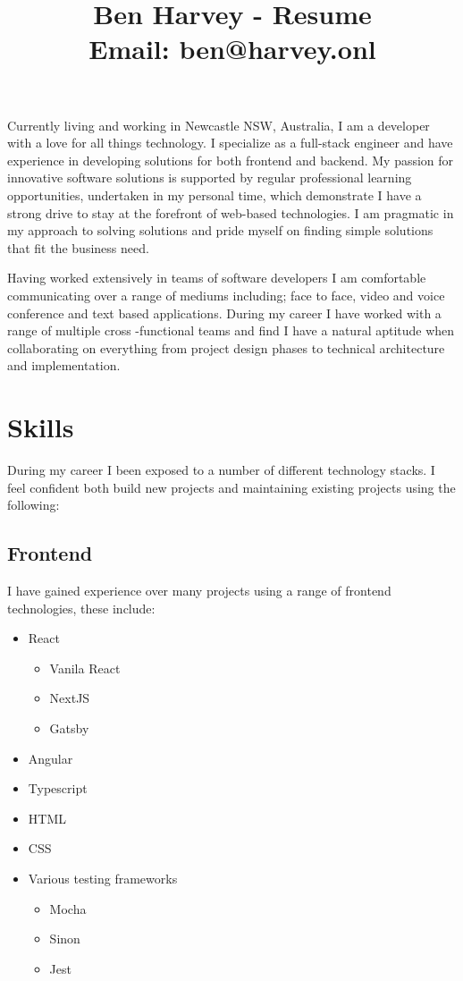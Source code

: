\documentclass[11pt]{article}
\date{}
\title{Ben Harvey - Resume\\\medskip
\large Email: ben@harvey.onl}
\begin{document}
\maketitle
Currently living and working in Newcastle NSW, Australia, I am a developer with a love for all things technology. I specialize as a full-stack engineer and have experience in developing solutions for both frontend and backend. My passion for innovative software solutions is supported by regular professional learning opportunities, undertaken in my personal time, which demonstrate I have a strong drive to stay at the forefront of web-based technologies. I am pragmatic in my approach to solving solutions and pride myself on finding simple solutions that fit the business need.

Having worked extensively in teams of software developers I am comfortable communicating over a range of mediums including; face to face, video and voice conference and text based applications. During my career I have worked with a range of multiple cross -functional teams and find I have a natural aptitude when collaborating on everything from project design phases to technical architecture and implementation.
\section*{Skills}
\label{sec:org9174578}

During my career I been exposed to a number of different technology stacks. I feel confident both build new projects and maintaining existing projects using the following:
\subsection*{Frontend}
\label{sec:org9ac8f46}

I have gained experience over many projects using a range of frontend technologies, these include:

\begin{itemize}
\item React
\begin{itemize}
\item Vanila React
\item NextJS
\item Gatsby
\end{itemize}
\item Angular
\item Typescript
\item HTML
\item CSS
\item Various testing frameworks
\begin{itemize}
\item Mocha
\item Sinon
\item Jest
\end{itemize}
\end{itemize}
\end{document}

